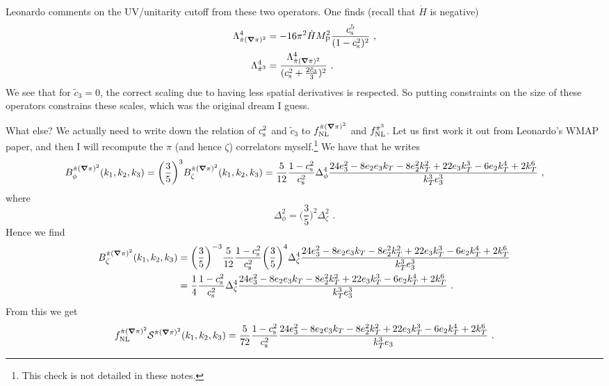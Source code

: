 \documentclass[aps,prd,amsmath,floats,floatfix,superscriptaddress,nofootinbib%
]{revtex4}%
\renewcommand\({\left(}
\renewcommand\){\right)}
\renewcommand\[{\left[}
\renewcommand\]{\right]}
\renewcommand{\vec}{\bm}
\def\mpl{M_{\rm P}}
\begin{document}
Leonardo comments on the UV/unitarity cutoff from these two operators. One finds (recall that $\dot{H}$ is negative) 
\begin{align}
\Lambda^4_{\dot{\pi}(\vec{\nabla}\pi)^2} &= -16\pi^2\dot{H}\mpl^2\frac{c^5_{\rm s}}{(1-c^2_{\rm s})^2}\,\,, \\
\Lambda^4_{\dot{\pi}^3} &= \frac{\Lambda^4_{\dot{\pi}(\vec{\nabla}\pi)^2}}{(c^2_{\rm s} + \frac{2\tilde{c}_3}{3})^2}\,\,.
\end{align}
We see that for $\tilde{c}_3 = 0$, the correct scaling due to having less spatial derivatives is respected. So putting constraints on the size of these operators constrains these scales, which was the original dream I guess. 

What else? We actually need to write down the relation of $c^2_{\rm s}$ and $\tilde{c}_3$ to 
$f_{\rm NL}^{\dot{\pi}(\vec{\nabla}\pi)^2}$ and $f_{\rm NL}^{\dot{\pi}^3}$. Let us first work it out from Leonardo's WMAP paper, 
and then I will recompute the $\pi$ (and hence $\zeta$) correlators myself.\footnote{This check is not detailed in these notes.} 
We have that he writes 
\begin{equation}
B_\phi^{\dot{\pi}(\vec{\nabla}\pi)^2}(k_1,k_2,k_3) = \bigg(\frac{3}{5}\bigg)^3B_\zeta^{\dot{\pi}(\vec{\nabla}\pi)^2}(k_1,k_2,k_3) = \frac{5}{12}\frac{1-c^2_{\rm s}}{c^2_{\rm s}}\Delta^4_\phi 
\frac{24e_3^2-8e_2e_3k_T-8e_2^2k_T^2+22e_3k_T^3-6e_2k_T^4+2k_T^6}{k_T^3 e_3^3}\,\,, 
\end{equation}
where 
\begin{equation}
\Delta^2_\phi = \bigg(\frac{3}{5}\bigg)^2\Delta^2_\zeta\,\,. 
\end{equation}
Hence we find 
\begin{equation}
\begin{split}
B_\zeta^{\dot{\pi}(\vec{\nabla}\pi)^2}(k_1,k_2,k_3) &= \bigg(\frac{3}{5}\bigg)^{-3} \frac{5}{12}\frac{1-c^2_{\rm s}}{c^2_{\rm s}}\bigg(\frac{3}{5}\bigg)^4\Delta^4_\zeta 
\frac{24e_3^2-8e_2e_3k_T-8e_2^2k_T^2+22e_3k_T^3-6e_2k_T^4+2k_T^6}{k_T^3 e_3^3} \\
&=\frac{1}{4}\frac{1-c^2_{\rm s}}{c^2_{\rm s}} \Delta^4_\zeta 
\frac{24e_3^2-8e_2e_3k_T-8e_2^2k_T^2+22e_3k_T^3-6e_2k_T^4+2k_T^6}{k_T^3 e_3^3}\,\,. 
\end{split}
\end{equation}
From this we get 
\begin{equation}
f_{\rm NL}^{\dot{\pi}(\vec{\nabla}\pi)^2} {\cal S}^{\dot{\pi}(\vec{\nabla}\pi)^2}(k_1,k_2,k_3) = \frac{5}{72}\frac{1-c^2_{\rm s}}{c^2_{\rm s}} 
\frac{24e_3^2-8e_2e_3k_T-8e_2^2k_T^2+22e_3k_T^3-6e_2k_T^4+2k_T^6}{k_T^3 e_3}\,\,. 
\end{equation} 
\end{document}
